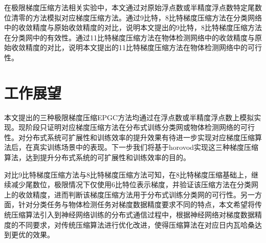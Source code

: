 在极限梯度压缩方法相关实验中，本文通过对原始浮点数或半精度浮点数特定尾数位清零的方法模拟对应梯度压缩方法。通过9比特，8比特梯度压缩方法在分类网络中的收敛精度与原始收敛精度的对比，说明本文提出的9比特，8比特梯度压缩方法在分类网中的有效性。通过11比特梯度压缩方法在物体检测网络中的收敛精度与原始收敛精度的对比，说明本文提出的11比特梯度压缩方法在物体检测网络中的可行性。 
\section{工作展望}
本文提出的三种极限梯度压缩EPGC方法均通过在浮点数或半精度浮点数上模拟实现。现阶段只证明对应梯度压缩方法在分布式训练分类网或物体检测网络的可行性。对分布式系统可扩展性和训练效率的提升效果有待进一步实现对应梯度压缩算法后，在真实训练场景中的表现。下一步我们将基于horovod实现这三种梯度压缩算法，达到提升分布式系统的可扩展性和训练效率的目的。

对比9比特梯度压缩方法与8比特梯度压缩方法可知，在8比特梯度压缩基础上，继续减少尾数位，极限情况下仅使用6比特位表示梯度，并验证该压缩方法在分类网上的收敛精度，进而判断该梯度压缩方法用于分布式训练分类网的可行性。另一方面，针对分类任务与物体检测任务对梯度数据精度要求不同的特点，本文希望将传统压缩算法引入到神经网络训练的分布式通信过程中，根据神经网络对梯度数据精度的不同要求，对传统压缩算法进行优化改进，使得压缩算法在对应日内瓦哈桑达到更优的效果。

